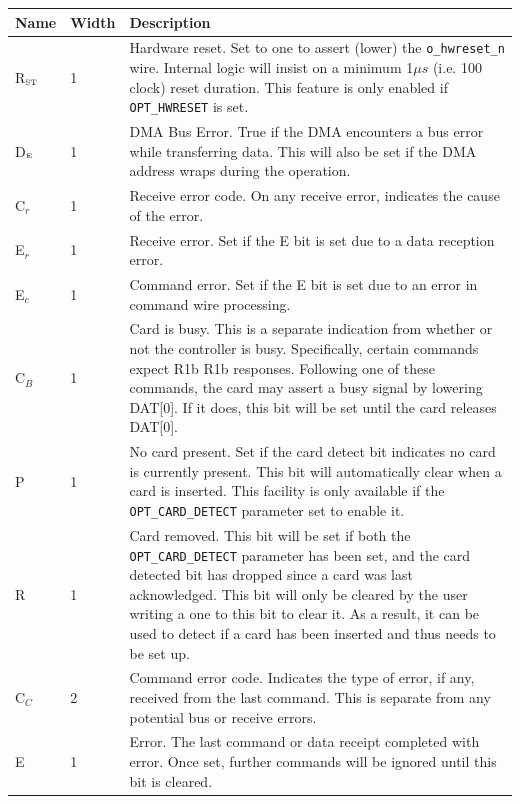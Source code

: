 \documentclass{gqtekspec}
\begin{document}
\begin{table}\begin{center}
\begin{tabular}{|p{1.2in}|p{0.5in}|p{4.0in}|}\hline
	\rowcolor[gray]{0.85} Name & Width & Description\\\hline\hline
R$_{\mbox{\tiny ST}}$&1& Hardware reset.  Set to one to assert (lower) the
	{\tt o\_hwreset\_n} wire.  Internal logic will insist on a minimum
	1$\mu s$ (i.e. 100 clock) reset duration.  This feature is only
	enabled if {\tt OPT\_HWRESET} is set.\\
D$_{\mbox{\tiny E}}$&1& DMA Bus Error.  True if the DMA encounters a bus error
	while transferring data.  This will also be set if the DMA address
	wraps during the operation. \\
C$_r$&1& Receive error code.  On any receive error, indicates the cause of
	the error. \\
E$_r$&1& Receive error.  Set if the E bit is set due to a data reception error.
	\\
E$_c$&1& Command error.  Set if the E bit is set due to an error in command
	wire processing.  \\
C$_B$&1& Card is busy.  This is a separate indication from whether or not the
	controller is busy.  Specifically, certain commands expect R1b
	R1b responses.  Following one of these commands, the card may assert a
	busy signal by lowering DAT[0].  If it does, this bit will be set
	until the card releases DAT[0].\\
P & 1 & No card present.  Set if the card detect bit indicates no card is
	currently present.  This bit will automatically clear when a card
	is inserted.  This facility is only available if the
	{\tt OPT\_CARD\_DETECT} parameter set to enable it.\\
R & 1 & Card removed.  This bit will be set if both the {\tt OPT\_CARD\_DETECT}
	parameter has been set, and the card detected bit has dropped since
	a card was last acknowledged.  This bit will only be cleared by the user
	writing a one to this bit to clear it.   As a result, it can be used
	to detect if a card has been inserted and thus needs to be set up. \\
C$_C$&2& Command error code.  Indicates the type of error, if any, received
	from the last command.  This is separate from any potential bus or
	receive errors. \\
E & 1 & Error.  The last command or data receipt completed with error.  
	Once set, further commands will be ignored until this bit is cleared.

\end{tabular}
\end{center}
\end{table}
\end{document}
